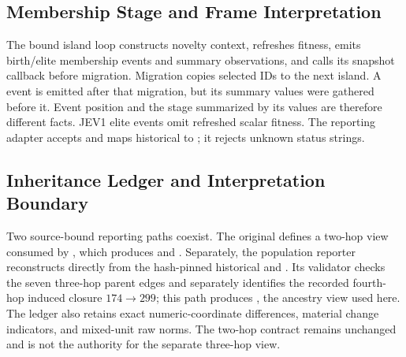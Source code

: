 \subsection{Membership Stage and Frame Interpretation}
The bound island loop constructs novelty context, refreshes fitness, emits birth/elite membership events and summary observations, and calls its snapshot callback before migration. Migration copies selected IDs to the next island. A  event is emitted after that migration, but its summary values were gathered before it. Event position and the stage summarized by its values are therefore different facts. JEV1 elite events omit refreshed scalar fitness. The reporting adapter accepts  and maps historical  to ; it rejects unknown status strings.

\subsection{Inheritance Ledger and Interpretation Boundary}
Two source-bound reporting paths coexist. The original  defines a two-hop view consumed by , which produces  and . Separately, the population reporter reconstructs  directly from the hash-pinned historical  and . Its validator checks the seven three-hop parent edges and separately identifies the recorded fourth-hop induced closure $174\to299$; this path produces , the ancestry view used here. The ledger also retains exact numeric-coordinate differences, material change indicators, and mixed-unit raw norms. The two-hop contract remains unchanged and is not the authority for the separate three-hop view.
